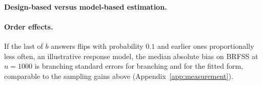 \paragraph{Design-based versus model-based estimation.}
\nModelParagraph

\paragraph{Order effects.}
If the last of $b$ answers flips with probability $0.1$ and earlier ones proportionally less often, an illustrative response model, the median absolute bias on BRFSS at $n=1000$ is \nPosBranch{} branching standard errors for branching and \nPosFit{} for the fitted form, comparable to the sampling gains above (Appendix~\ref{app:measurement}).
